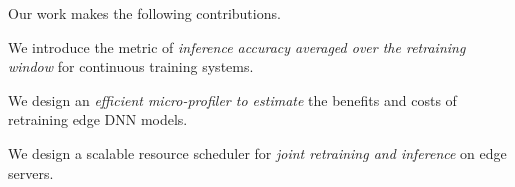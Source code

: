  Our work makes the following contributions. 


 We introduce the metric of {\em inference accuracy averaged over the retraining window} for continuous training systems.

 We design an {\em efficient micro-profiler to estimate} the benefits and costs of retraining edge DNN models. 

 We design a scalable resource scheduler for {\em joint retraining and inference} on edge servers. %
 
